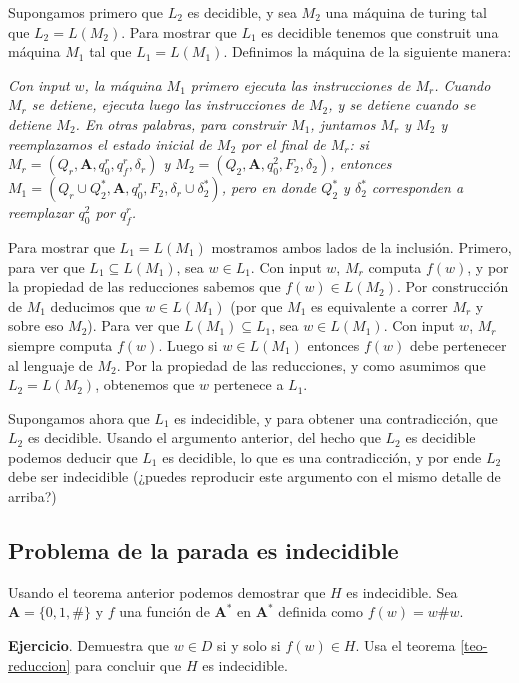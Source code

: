 \documentclass[12pt]{article}
\newcommand{\A}{\textbf{A}}
\begin{document}
Supongamos primero que $L_2$ es decidible, y sea $M_2$ una máquina de turing tal 
que $L_2 = L(M_2)$. Para mostrar que $L_1$ es decidible tenemos que construit una máquina $M_1$ tal que 
$L_1 = L(M_1)$. Definimos la máquina de la siguiente manera: 

\smallskip
\noindent
\textit{
Con input $w$, la máquina $M_1$ primero ejecuta las instrucciones de $M_r$. Cuando $M_r$ se detiene, ejecuta luego las 
instrucciones de $M_2$, y se detiene cuando se detiene $M_2$. En otras palabras, para construir $M_1$, 
juntamos $M_r$ y $M_2$ y reemplazamos el estado inicial de $M_2$ por el final de $M_r$: 
si $M_r = (Q_r,\A,q_0^r,q_f^r,\delta_r)$ y $M_2 = (Q_2,\A,q_0^2,F_2,\delta_2)$, entonces 
$M_1 = (Q_r \cup Q_2^*,\A,q_0^r,F_2,\delta_r \cup \delta_2^*)$, pero en donde $Q_2^*$ y $\delta_2^*$ 
corresponden a reemplazar $q_0^2$ por $q_f^r$. }

\smallskip
Para mostrar que $L_1 = L(M_1)$ mostramos ambos lados de la inclusión. Primero, para ver que $L_1 \subseteq L(M_1)$, 
sea $w \in L_1$. Con input $w$, $M_r$ computa $f(w)$, y por la propiedad de las reducciones sabemos que 
$f(w) \in L(M_2)$. Por construcción de $M_1$ deducimos que $w \in L(M_1)$ (por que $M_1$ es equivalente a correr $M_r$ y sobre eso $M_2$). Para ver que $L(M_1) \subseteq L_1$, 
sea $w \in L(M_1)$. Con input $w$, $M_r$ siempre computa $f(w)$. Luego si $w \in L(M_1)$ entonces 
$f(w)$ debe pertenecer al lenguaje de $M_2$. Por la propiedad de las reducciones, y como asumimos que $L_2 = L(M_2)$, 
obtenemos que $w$ pertenece a $L_1$. 

\medskip

Supongamos ahora que $L_1$ es indecidible, y para obtener una contradicción, que $L_2$ es decidible. 
Usando el argumento anterior, del hecho que $L_2$ es decidible podemos deducir que $L_1$ es decidible, lo que es una 
contradicción, y por ende $L_2$ debe ser indecidible (¿puedes reproducir este argumento con el mismo detalle de arriba?)


\subsection*{Problema de la parada es indecidible}

Usando el teorema anterior podemos demostrar que $H$ es indecidible. 
Sea $\A = \{0,1,\#\}$ y $f$ una función de $\A^*$ en $\A^*$ definida como 
$f(w) = w\#w$. 

\medskip
\noindent
\textbf{Ejercicio}. Demuestra que $w \in D$ si y solo si $f(w) \in H$. Usa el teorema \ref{teo-reduccion} para concluir que $H$ es indecidible. 
\end{document}
